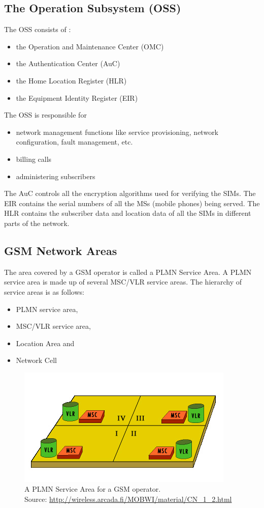 \subsection{The Operation Subsystem (OSS)}

The OSS consists of :
\begin{itemize}
\item the Operation and Maintenance Center (OMC)
\item the Authentication Center (AuC)
\item the Home Location Register (HLR)
\item the Equipment Identity Register (EIR)
\end{itemize}

The OSS is responsible for
\begin{itemize}
\item network management functions like service provisioning, network configuration, fault management, etc.
\item billing calls
\item administering subscribers
\end{itemize}

The AuC controls all the encryption algorithms used for verifying the SIMs. The EIR contains the serial numbers of all the MSs (mobile phones) being served. The HLR contains the subscriber data and location data of all the SIMs in different parts of the network.

\subsection{GSM Network Areas}

The area covered by a GSM operator is called a PLMN Service Area. A PLMN service area is made up of several MSC/VLR service areas. The hierarchy of service areas is as follows:
\begin{itemize}
\item PLMN service area,
\item MSC/VLR service area,
\item Location Area and
\item Network Cell
\end{itemize}
\begin{figure}
\centering
\includegraphics[scale=0.7]{PLMNServiceArea}
\caption[A PLMN Service Area for a GSM operator]{A PLMN Service Area for a GSM operator.\\
\footnotesize{Source: \url{http://wireless.arcada.fi/MOBWI/material/CN\_1\_2.html}}}
\end{figure}



